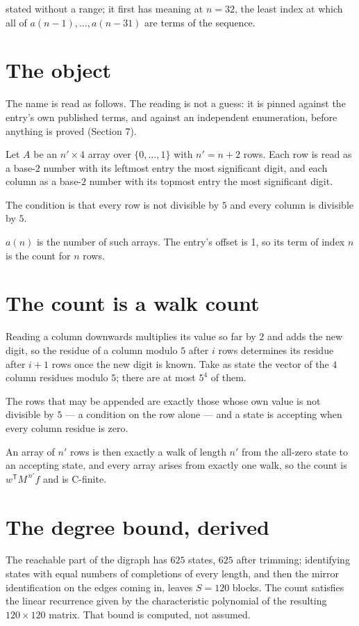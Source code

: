 \documentclass[11pt]{article}
\theoremstyle{definition}
\begin{document}
stated without a range; it first has meaning at $n = 32$, the least index at which all of $a(n-1),\dots,a(n-31)$ are terms of the sequence.

\section{The object}

The name is read as follows. The reading is not a guess: it is pinned against the entry's own published terms, and against an independent enumeration, before anything is proved (Section 7).

Let $A$ be an $n' \times 4$ array over $\{0,\dots,1\}$ with $n' = n + 2$ rows. Each row is read as a base-$2$ number with its leftmost entry the most significant digit, and each column as a base-$2$ number with its topmost entry the most significant digit.

The condition is that every row is not divisible by $5$ and every column is divisible by $5$.

$a(n)$ is the number of such arrays. The entry's offset is 1, so its term of index $n$ is the count for $n$ rows.

\section{The count is a walk count}

Reading a column downwards multiplies its value so far by $2$ and adds the new digit, so the residue of a column modulo $5$ after $i$ rows determines its residue after $i+1$ rows once the new digit is known. Take as state the vector of the $4$ column residues modulo $5$; there are at most $5^{4}$ of them.

The rows that may be appended are exactly those whose own value is not divisible by $5$ --- a condition on the row alone --- and a state is accepting when every column residue is zero.

An array of $n'$ rows is then exactly a walk of length $n'$ from the all-zero state to an accepting state, and every array arises from exactly one walk, so the count is $w^{\mathsf T}M^{\,n'}f$ and is C-finite.

\section{The degree bound, derived}

The reachable part of the digraph has $625$ states, $625$ after trimming; identifying states with equal numbers of completions of every length, and then the mirror identification on the edges coming in, leaves $S = 120$ blocks. The count satisfies the linear recurrence given by the characteristic polynomial of the resulting $120\times120$ matrix. That bound is computed, not assumed.
\end{document}
